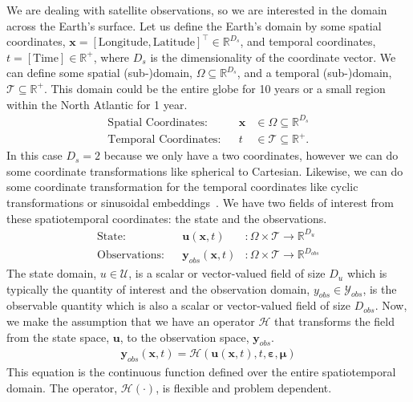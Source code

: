 We are dealing with satellite observations, so we are interested in the domain across the Earth's surface. 
Let us define the Earth's domain by some spatial coordinates, $\mathbf{x} = [\text{Longitude},\text{Latitude}]^\top \in\mathbb{R}^{D_s}$, and temporal coordinates, $t=[\text{Time}]\in\mathbb{R}^+$, where $D_s$ is the dimensionality of the coordinate vector.  
We can define some spatial (sub-)domain, $\Omega\subseteq\mathbb{R}^{D_s}$, and a temporal (sub-)domain, $\mathcal{T}\subseteq\mathbb{R}^+$. 
This domain could be the entire globe for 10 years or a small region within the North Atlantic for 1 year.
\begin{align}  \label{eq:spatiotemporal_coords}
    \text{Spatial Coordinates}: && \mathbf{x} &\in \Omega \subseteq \mathbb{R}^{D_s}\\ 
    \text{Temporal Coordinates}: && t &\in \mathcal{T} \subseteq \mathbb{R}^+.
\end{align}
In this case $D_s=2$ because we only have a two coordinates, however we can do some coordinate transformations like spherical to Cartesian. Likewise, we can do some coordinate transformation for the temporal coordinates like cyclic transformations or sinusoidal embeddings~\cite{ATTENTION}. We have two fields of interest from these spatiotemporal coordinates: the state and the observations.
\begin{align} \label{eq:state_obs}
    \text{State}: && \boldsymbol{u}(\mathbf{x},t) &: \Omega\times\mathcal{T}\rightarrow\mathbb{R}^{D_u} \\
    \text{Observations}: && \boldsymbol{y}_{obs}(\mathbf{x},t) &: \Omega\times\mathcal{T}\rightarrow\mathbb{R}^{D_{obs}}
\end{align}
The state domain, $u\in\mathcal{U}$, is a scalar or vector-valued field of size $D_u$ which is typically the quantity of interest and the observation domain, $y_{obs}\in\mathcal{Y}_{obs}$, is the observable quantity which is also a scalar or vector-valued field of size $D_{obs}$. Now, we make the assumption that we have an operator $\mathcal{H}$ that transforms the field from the state space, $\boldsymbol{u}$, to the observation space, $\boldsymbol{y}_{obs}$.
\begin{align} \label{eq:prob_definition}
    \boldsymbol{y}_{obs}(\mathbf{x},t) = \mathcal{H}\left(\boldsymbol{u}(\mathbf{x},t), t, \boldsymbol{\varepsilon}, \boldsymbol{\mu}\right) 
\end{align}
This equation is the continuous function defined over the entire spatiotemporal domain.  
The operator, $\mathcal{H}(\cdot)$, is flexible and problem dependent.
